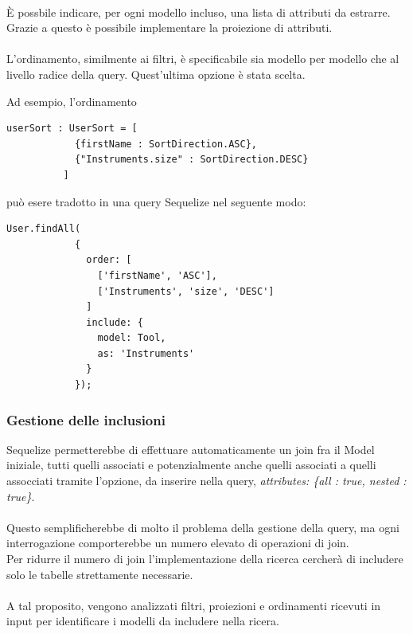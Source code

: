 \documentclass[a4paper, 12pt]{report}
\begin{document}
        \paragraph*{}
        È possbile indicare, per ogni modello incluso, una lista di attributi da estrarre. Grazie a questo è possibile implementare la proiezione di attributi.
        \paragraph*{}
        L'ordinamento, similmente ai filtri, è specificabile sia modello per modello che al livello radice della query. Quest'ultima opzione è stata scelta.

        Ad esempio, l'ordinamento
        \begin{Verbatim}[samepage=true]
          userSort : UserSort = [
            {firstName : SortDirection.ASC},
            {"Instruments.size" : SortDirection.DESC}
          ]
        \end{Verbatim}
        può esere tradotto in una query Sequelize nel seguente modo:
        \begin{Verbatim}[samepage=true]
          User.findAll(
            {
              order: [
                ['firstName', 'ASC'],
                ['Instruments', 'size', 'DESC']
              ]
              include: {
                model: Tool,
                as: 'Instruments'
              }
            });
        \end{Verbatim}
      \subsubsection*{Gestione delle inclusioni}
        Sequelize permetterebbe di effettuare automaticamente un join fra il Model iniziale, tutti quelli associati e potenzialmente anche quelli associati a quelli assocciati tramite l'opzione, da inserire nella query,
        \emph{attributes: \{all : true, nested : true\}}.
        \paragraph*{}
        Questo semplificherebbe di molto il problema della gestione della query, ma ogni interrogazione comporterebbe un numero elevato di operazioni di join.\\
        Per ridurre il numero di join l'implementazione della ricerca cercherà di includere solo le tabelle strettamente necessarie.
        \paragraph*{}
        A tal proposito, vengono analizzati filtri, proiezioni e ordinamenti ricevuti in input per identificare i modelli da includere nella ricera.
\end{document}
